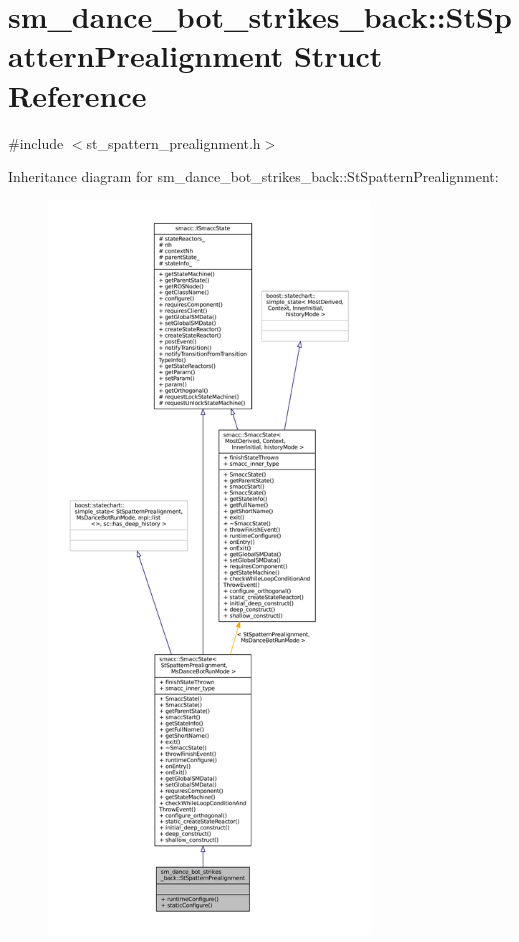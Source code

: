 \hypertarget{structsm__dance__bot__strikes__back_1_1StSpatternPrealignment}{}\section{sm\+\_\+dance\+\_\+bot\+\_\+strikes\+\_\+back\+:\+:St\+Spattern\+Prealignment Struct Reference}
\label{structsm__dance__bot__strikes__back_1_1StSpatternPrealignment}


{\ttfamily \#include $<$st\+\_\+spattern\+\_\+prealignment.\+h$>$}



Inheritance diagram for sm\+\_\+dance\+\_\+bot\+\_\+strikes\+\_\+back\+:\+:St\+Spattern\+Prealignment\+:
\nopagebreak
\begin{figure}[H]
\begin{center}
\leavevmode
\includegraphics[height=550pt]{structsm__dance__bot__strikes__back_1_1StSpatternPrealignment__inherit__graph}
\end{center}
\end{figure}


